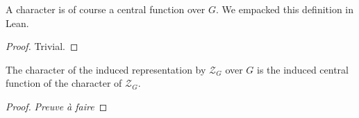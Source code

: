 \begin{definition}
    \label{def:char_central_fun}
    \leanok 
    A character is of course a central function over $G$. We empacked this definition
    in Lean.
    \begin{proof}
        \leanok
        Trivial.
    \end{proof}
\end{definition}


\begin{proposition}
    \label{prop:induced_char}
    \leanok 
    The character of the induced representation by $\mathcal{Z}_G$ over $G$ is the induced 
    central function of the character of $\mathcal{Z}_G$.
\end{proposition}
\begin{proof}
    \textit{Preuve à faire}
\end{proof}